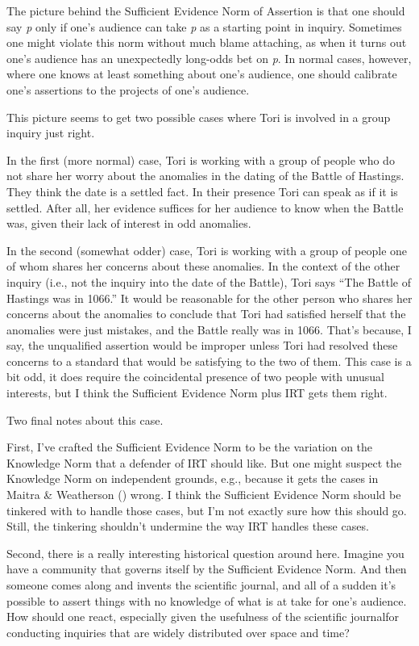 \documentclass[
  10pt,
  letterpaper,
  twoside]{scrbook}
\begin{document}
The picture behind the Sufficient Evidence Norm of Assertion is that one
should say \emph{p} only if one's audience can take \emph{p} as a
starting point in inquiry. Sometimes one might violate this norm without
much blame attaching, as when it turns out one's audience has an
unexpectedly long-odds bet on \emph{p}. In normal cases, however, where
one knows at least something about one's audience, one should calibrate
one's assertions to the projects of one's audience.

This picture seems to get two possible cases where Tori is involved in a
group inquiry just right.

In the first (more normal) case, Tori is working with a group of people
who do not share her worry about the anomalies in the dating of the
Battle of Hastings. They think the date is a settled fact. In their
presence Tori can speak as if it is settled. After all, her evidence
suffices for her audience to know when the Battle was, given their lack
of interest in odd anomalies.

In the second (somewhat odder) case, Tori is working with a group of
people one of whom shares her concerns about these anomalies. In the
context of the other inquiry (i.e., not the inquiry into the date of the
Battle), Tori says ``The Battle of Hastings was in 1066.'' It would be
reasonable for the other person who shares her concerns about the
anomalies to conclude that Tori had satisfied herself that the anomalies
were just mistakes, and the Battle really was in 1066. That's because, I
say, the unqualified assertion would be improper unless Tori had
resolved these concerns to a standard that would be satisfying to the
two of them. This case is a bit odd, it does require the coincidental
presence of two people with unusual interests, but I think the
Sufficient Evidence Norm plus IRT gets them right.

Two final notes about this case.

First, I've crafted the Sufficient Evidence Norm to be the variation on
the Knowledge Norm that a defender of IRT should like. But one might
suspect the Knowledge Norm on independent grounds, e.g., because it gets
the cases in Maitra \& Weatherson
() wrong. I think the
Sufficient Evidence Norm should be tinkered with to handle those cases,
but I'm not exactly sure how this should go. Still, the tinkering
shouldn't undermine the way IRT handles these cases.

Second, there is a really interesting historical question around here.
Imagine you have a community that governs itself by the Sufficient
Evidence Norm. And then someone comes along and invents the scientific
journal, and all of a sudden it's possible to assert things with no
knowledge of what is at take for one's audience. How should one react,
especially given the usefulness of the scientific journalfor conducting
inquiries that are widely distributed over space and time?
\end{document}
